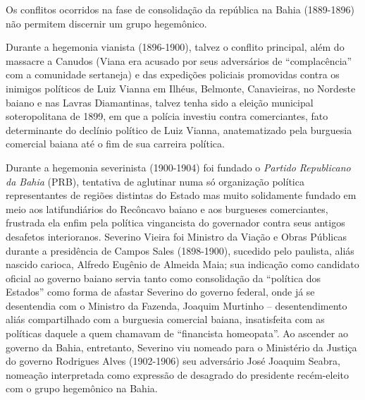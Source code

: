 Os conflitos ocorridos na fase de consolidação da república na Bahia (1889-1896) não permitem discernir um grupo hegemônico.

Durante a hegemonia vianista (1896-1900), talvez o conflito principal, além do massacre a Canudos (Viana era acusado por seus adversários de ``complacência'' com a comunidade sertaneja) e das expedições policiais promovidas contra os inimigos políticos de Luiz Vianna em Ilhéus, Belmonte, Canavieiras, no Nordeste baiano e nas Lavras Diamantinas, talvez tenha sido a eleição municipal soteropolitana de 1899, em que a polícia investiu contra comerciantes, fato determinante do declínio político de Luiz Vianna, anatematizado pela burguesia comercial baiana até o fim de sua carreira política. 

Durante a hegemonia severinista (1900-1904) foi fundado o \textit{Partido Republicano da Bahia} (PRB), tentativa de aglutinar numa só organização política representantes de regiões distintas do Estado mas muito solidamente fundado em meio aos latifundiários do Recôncavo baiano e aos burgueses comerciantes, frustrada ela enfim pela política vingancista do governador contra seus antigos desafetos interioranos. Severino Vieira foi Ministro da Viação e Obras Públicas durante a presidência de Campos Sales (1898-1900), sucedido pelo paulista, aliás nascido carioca, Alfredo Eugênio de Almeida Maia; sua indicação como candidato oficial ao governo baiano servia tanto como consolidação da ``política dos Estados'' como forma de afastar Severino do governo federal, onde já se desentendia com o Ministro da Fazenda, Joaquim Murtinho -- desentendimento aliás compartilhado com a burguesia comercial baiana, insatisfeita com as políticas daquele a quem chamavam de ``financista homeopata''. Ao ascender ao governo da Bahia, entretanto, Severino viu nomeado para o Ministério da Justiça do governo Rodrigues Alves (1902-1906) seu adversário José Joaquim Seabra, nomeação interpretada como expressão de desagrado do presidente recém-eleito com o grupo hegemônico na Bahia. 

